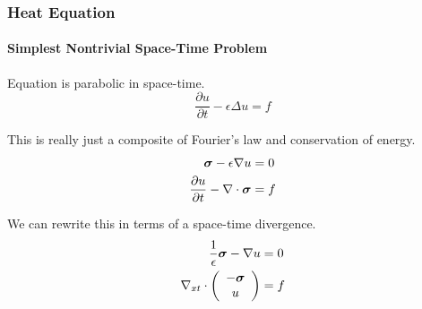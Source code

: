 \documentclass[18pt,xcolor=table]{beamer}
\begin{document}
%                                          
%                                          
%  
\begin{frame}[t]
\frametitle{Heat Equation}
\framesubtitle{Simplest Nontrivial Space-Time Problem}  %

Equation is parabolic in space-time.
\begin{equation*}
  \frac{\partial u}{\partial t}-\epsilon\Delta u=f
\end{equation*}

This is really just a composite of Fourier's law and conservation of energy.
\begin{equation*}
\begin{aligned}
\boldsymbol\sigma-\epsilon\nabla u&=0\\
\frac{\partial u}{\partial t}-\nabla\cdot\boldsymbol\sigma&=f
\end{aligned}
\end{equation*}

We can rewrite this in terms of a space-time divergence.
\begin{equation*}
\begin{aligned}
\frac{1}{\epsilon}\boldsymbol\sigma-\nabla u&=0\\
\nabla_{xt}\cdot\left( \begin{array}{c} -\boldsymbol\sigma\\ u\\ \end{array} \right)&=f
\end{aligned}
\end{equation*}
\end{frame}
\end{document}
